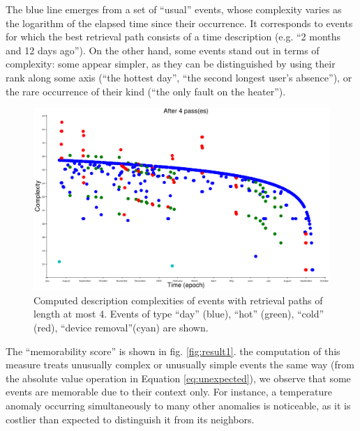 \documentclass[conference]{IEEEtran}
\begin{document}
The blue line emerges from a set of ``usual'' events, whose complexity varies as the logarithm of
the elapsed time since their occurrence. It corresponds to events
for which the best retrieval path consists of a time description (e.g. ``2
months and 12 days ago''). On the other hand, some events stand out in terms of
complexity: some appear simpler, as they can be distinguished by using their
rank along some axis (``the hottest day'', ``the second longest user's
absence''), or the rare occurrence of their kind (``the only fault on the heater'').

\begin{figure}[ht]
  \centering
  \includegraphics[width=\linewidth]{figures/complexities_computed}
\caption{Computed description complexities of events with retrieval paths of
    length at most 4. Events of type ``day'' (blue), ``hot'' (green), ``cold''
    (red), ``device removal''(cyan) are shown.}
  \label{fig:computed_cplx}
\end{figure}

The ``memorability score'' is shown in fig. \ref{fig:result1}.
the computation of this measure treats unusually complex or unusually simple events the
same way (from the absolute value operation in Equation \ref{eq:unexpected}), we
observe that some events are memorable due to their context only. For instance,
a temperature anomaly occurring simultaneously to many other anomalies is
noticeable, as it is costlier than expected to distinguish it from its neighbors.
\end{document}
